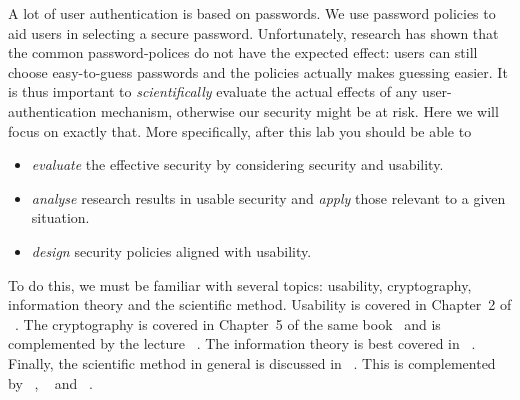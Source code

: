 A lot of user authentication is based on passwords.
We use password policies to aid users in selecting a secure password.
Unfortunately, research has shown that the common password-polices do not have 
the expected effect: users can still choose easy-to-guess passwords and the 
policies actually makes guessing easier.
It is thus important to \emph{scientifically} evaluate the actual effects of 
any user-authentication mechanism, otherwise our security might be at risk.
Here we will focus on exactly that.
More specifically, after this lab you should be able to
\begin{itemize}
  \item \emph{evaluate} the effective security by considering security and 
    usability.
  \item \emph{analyse} research results in usable security and \emph{apply} 
    those relevant to a given situation.
  \item \emph{design} security policies aligned with usability.
\end{itemize}

To do this, we must be familiar with several topics: usability, cryptography, 
information theory and the scientific method.
Usability is covered in Chapter~2 of 
~\cite{Anderson2008sea}.
The cryptography is covered in Chapter~5 of the same 
book~\cite{Anderson2008sea} and is complemented by the lecture 
~\cite{BoskHighLevelCrypto}.
The information theory is best covered in 
~\cite{Ueltschi2013se}.
Finally, the scientific method in general is discussed in 
~\cite{ComputerSecurityExperiments}.
This is complemented by
~\cite{GuessAgainAndAgain},
~\cite{OfPasswordsAndPeople} and
~\cite{CanLongPasswordsBeSecureAndUsable}.
